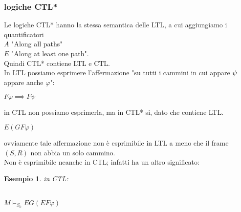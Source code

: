 \documentclass[a4paper,12pt]{article}
\theoremstyle{def}
\theoremstyle{prop}
\theoremstyle{esempio}
\newtheorem*{example}{Esempio}
\theoremstyle{dimostrazione}
\theoremstyle{teo}
\theoremstyle{osservazione}
\begin{document}
\subsubsection{logiche CTL*}
Le logiche CTL* hanno la stessa semantica delle LTL, a cui aggiungiamo i quantificatori\\
\(A\) "Along all paths"\\
\(E\) "Along at least one path".\\
Quindi CTL* contiene LTL e CTL.\\
In LTL possiamo esprimere l'affermazione "su tutti i cammini in cui appare \(\psi\) appare anche \(\varphi\)":
\begin{center}
	\(F\varphi \implies F \psi\)
\end{center}
in CTL non possiamo esprimerla, ma in CTL* si, dato che contiene LTL.\\
\begin{center}
	\(E(GF\varphi)\)
\end{center}
ovviamente tale affermazione non è esprimibile in LTL a meno che il frame \((S,R)\) non abbia un solo cammino.\\
Non è esprimibile neanche in CTL; infatti ha un altro significato:
\begin{example} in CTL:\\
	\begin{center}
        \\
		  \(M \vDash_{S_0} EG(EF \varphi)\)
	\end{center}
\end{example}
\newpage
\end{document}
